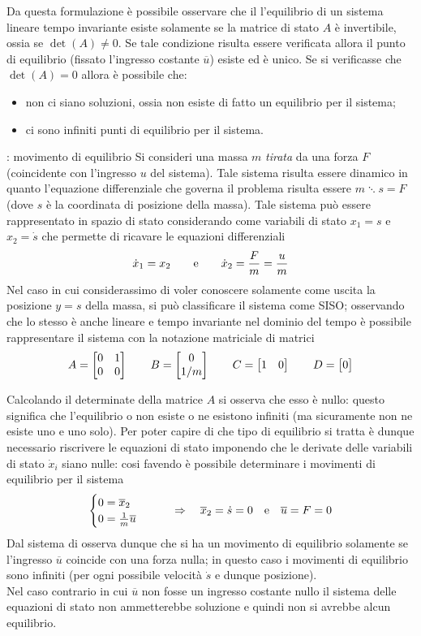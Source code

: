 		Da questa formulazione è possibile osservare che il l'equilibrio di un sistema lineare tempo invariante esiste solamente se la matrice di stato $A$ è invertibile, ossia se $\det(A)\neq 0$. Se tale condizione risulta essere verificata allora il punto di equilibrio (fissato l'ingresso costante $\overline u$) esiste ed è unico. Se si verificasse che $\det(A) = 0$ allora è possibile che:
		\begin{itemize}
			\item non ci siano soluzioni, ossia non esiste di fatto un equilibrio per il sistema;
			\item ci sono infiniti punti di equilibrio per il sistema.
		\end{itemize}
	
		\begin{esempio}{: movimento di equilibrio}
			Si consideri una massa $m$ \textit{tirata} da una forza $F$ (coincidente con l'ingresso $u$ del sistema). Tale sistema risulta essere dinamico in quanto l'equazione differenziale che governa il problema risulta essere $m\ddots s = F$ (dove $s$ è la coordinata di posizione della massa). Tale sistema può essere rappresentato in spazio di stato considerando come variabili di stato $x_1 = s$ e $x_2 = \dot s$ che permette di ricavare le equazioni differenziali
			\[ \dot x_1 = x_2 \qquad \textrm e \qquad \dot x_2 = \frac F m = \frac u m \]
			Nel caso in cui considerassimo di voler conoscere solamente come uscita la posizione $y = s$ della massa, si può classificare il sistema come SISO; osservando che lo stesso è anche lineare e tempo invariante nel dominio del tempo è possibile rappresentare il sistema con la notazione matriciale di matrici
			\[ A = \begin{bmatrix} 0 & 1 \\ 0 & 0 \end{bmatrix} \qquad B = \begin{bmatrix} 0 \\ 1/m \end{bmatrix} \qquad C = \begin{bmatrix} 1 & 0 \end{bmatrix} \qquad D = \begin{bmatrix} 0 \end{bmatrix} \]
			
			Calcolando il determinate della matrice $A$ si osserva che esso è nullo: questo significa che l'equilibrio o non esiste o ne esistono infiniti (ma sicuramente non ne esiste uno e uno solo). Per poter capire di che tipo di equilibrio si tratta è dunque necessario riscrivere le equazioni di stato imponendo che le derivate delle variabili di stato $\dot x_i$ siano nulle: cosi favendo è possibile determinare i movimenti di equilibrio per il sistema
			\[\begin{cases}
				0 = \overline x_2 \\ 0 = \frac 1 m \overline u
			\end{cases} \qquad \Rightarrow\quad \overline x_2 = \dot s = 0 \quad \textrm e \quad \overline u = F = 0\]
			Dal sistema di osserva dunque che si ha un movimento di equilibrio solamente se l'ingresso $\overline u$ coincide con una forza nulla; in questo caso i movimenti di equilibrio sono infiniti (per ogni possibile velocità $\dot s$ e dunque posizione). \\
			Nel caso contrario in cui $\overline u$ non fosse un ingresso costante nullo il sistema delle equazioni di stato non ammetterebbe soluzione e quindi non si avrebbe alcun equilibrio.			
		\end{esempio}
